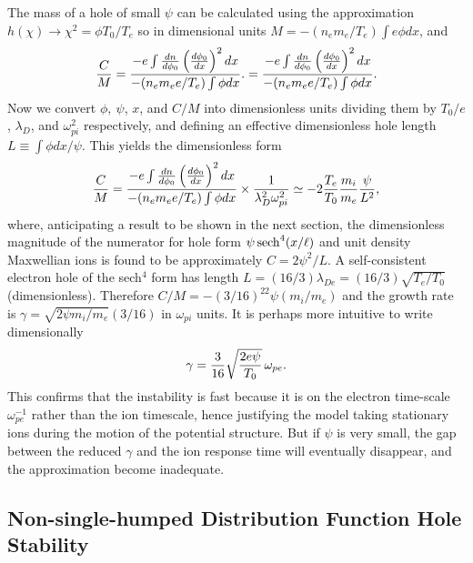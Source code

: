 \documentclass[12pt]{article}
\begin{document}
The mass of a hole of small $\psi$ can be calculated using the
approximation $h(\chi)\to \chi^2=\phi T_0/T_e$ so in dimensional units
$M=-(n_em_e/T_e)\int e\phi dx$, and
\begin{equation}
  \label{eq:CbyM}
  {C\over M}= {-e\int {dn\over d\phi_0}\left(d\phi_0\over dx\right)^2 dx
    \over -(n_em_ee/T_e)\int \phi dx }.
  ={-e\int {dn\over d\phi_0}\left(d\phi_0\over dx\right)^2 dx
    \over -(n_em_ee/T_e)\int \phi dx }.
\end{equation}
Now we convert $\phi,\ \psi$, $x$, and $C/M$ into dimensionless units
dividing them by $T_0/e$, $\lambda_D$, and $\omega_{pi}^2$
respectively, and defining an effective dimensionless hole length
$L\equiv\int\phi dx/\psi$. This yields the dimensionless form
\begin{equation}
  \label{eq:CbyMless}
   {C\over M}= {-e\int {dn\over d\phi_0}\left(d\phi_0\over dx\right)^2 dx
     \over -(n_em_ee/T_e)\int \phi dx } \times {1\over
     \lambda_D^2 \omega_{pi}^2}
   \simeq -2 {T_e\over T_0} {m_i\over m_e} {\psi \over L^2},
 \end{equation}
 where, anticipating a result to be shown in the next section, the
 dimensionless magnitude of the numerator for hole form
 $\psi\, {\rm sech}^4(x/\ell)$ and unit density Maxwellian ions
 is found to be approximately $C=2\psi^2/L$.  A self-consistent electron
 hole of the sech$^4$ form has length
 $L=(16/3)\lambda_{De}= (16/3)\sqrt{T_e/T_0}$ (dimensionless).
 Therefore $C/M=-(3/16)^22\psi (m_i/m_e)$ and the growth rate is
 $\gamma=\sqrt{2\psi m_i/m_e}(3/16)$ in $\omega_{pi}$ units. It is
 perhaps more intuitive to write dimensionally
 \begin{equation}
   \label{eq:gamma}
 \gamma={3\over 16}\sqrt{2e\psi\over T_0}\,\omega_{pe}.   
 \end{equation}
 This confirms that the
 instability is fast because it is on the electron time-scale
 $\omega_{pe}^{-1}$ rather than the ion timescale, hence justifying
 the model taking stationary ions during the motion of the potential
 structure. But if $\psi$ is very small, the gap between the reduced
 $\gamma$ and the ion response time will eventually disappear, and the
 approximation become inadequate.



\subsection{Non-single-humped Distribution Function Hole Stability}
\label{section2.3}
\end{document}
